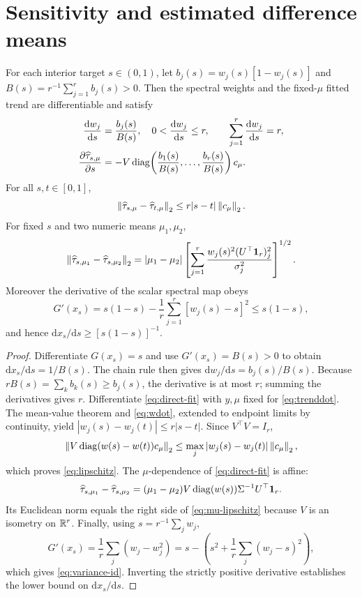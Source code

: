 \section{Sensitivity and estimated difference means}\label{sec:plugin}

\begin{theorem}\label{thm:sensitivity}
For each interior target $s\in(0,1)$, let
$b_j(s)=w_j(s)[1-w_j(s)]$ and
$B(s)=r^{-1}\sum_{j=1}^r b_j(s)>0$.
Then the spectral weights and the fixed-$\mu$ fitted trend
are differentiable and satisfy
\begin{align}
\frac{\mathrm d w_j}{\mathrm ds}
&=\frac{b_j(s)}{B(s)},\quad
0<\frac{\mathrm dw_j}{\mathrm ds}\le r,
\qquad \sum_{j=1}^r\frac{\mathrm dw_j}{\mathrm ds}=r,
\label{eq:wdot}\\
\frac{\partial\widehat\tau_{s,\mu}}{\partial s}
&=-V\operatorname{diag}\!\left(\frac{b_1(s)}{B(s)},\ldots,
\frac{b_r(s)}{B(s)}\right)c_\mu.\label{eq:trenddot}
\end{align}
For all $s,t\in[0,1]$,
\begin{equation}\label{eq:lipschitz}
\left\lVert\widehat\tau_{s,\mu}-\widehat\tau_{t,\mu}\right\rVert_2
\le r|s-t|\left\lVert c_\mu\right\rVert_2 .
\end{equation}
For fixed $s$ and two numeric means $\mu_1,\mu_2$,
\begin{equation}\label{eq:mu-lipschitz}
\left\lVert\widehat\tau_{s,\mu_1}-\widehat\tau_{s,\mu_2}\right\rVert_2
=|\mu_1-\mu_2|
\left[\sum_{j=1}^r
\frac{w_j(s)^2(U^\top\mathbf 1_r)_j^2}{\sigma_j^2}\right]^{1/2}.
\end{equation}
Moreover the derivative of the scalar spectral map obeys
\begin{equation}\label{eq:variance-id}
G'(x_s)=s(1-s)
-\frac1r\sum_{j=1}^r[w_j(s)-s]^2
\le s(1-s),
\end{equation}
and hence $\mathrm dx_s/\mathrm ds\ge[s(1-s)]^{-1}$.
\end{theorem}
\begin{proof}
Differentiate $G(x_s)=s$ and use
$G'(x_s)=B(s)>0$ to obtain
$\mathrm dx_s/\mathrm ds=1/B(s)$.
The chain rule then gives
$\mathrm dw_j/\mathrm ds=b_j(s)/B(s)$.
Because $rB(s)=\sum_k b_k(s)\ge b_j(s)$,
the derivative is at most $r$; summing the derivatives gives $r$.
Differentiate \eqref{eq:direct-fit} with $y,\mu$ fixed for
\eqref{eq:trenddot}. The mean-value theorem and
\eqref{eq:wdot}, extended to endpoint limits by continuity,
yield $|w_j(s)-w_j(t)|\le r|s-t|$.
Since $V^\top V=I_r$,
\[
\left\lVert V\operatorname{diag}(w(s)-w(t))c_\mu\right\rVert_2
\le\max_j|w_j(s)-w_j(t)|\left\lVert c_\mu\right\rVert_2,
\]
which proves \eqref{eq:lipschitz}.
The $\mu$-dependence of \eqref{eq:direct-fit} is affine:
\[
\widehat\tau_{s,\mu_1}-\widehat\tau_{s,\mu_2}
=(\mu_1-\mu_2)V\operatorname{diag}(w(s))\Sigma^{-1}U^\top\mathbf 1_r.
\]
Its Euclidean norm equals the right side of
\eqref{eq:mu-lipschitz} because $V$ is an isometry on $\mathbb R^r$.
Finally, using $s=r^{-1}\sum_jw_j$,
\[
G'(x_s)=\frac1r\sum_j(w_j-w_j^2)
=s-\left(s^2+\frac1r\sum_j(w_j-s)^2\right),
\]
which gives \eqref{eq:variance-id}. Inverting the strictly
positive derivative establishes the lower bound on
$\mathrm dx_s/\mathrm ds$.
\end{proof}

